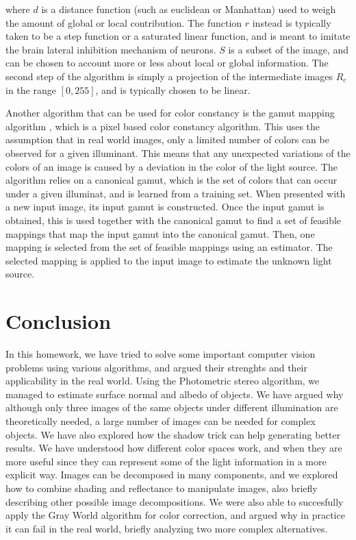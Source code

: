 \documentclass{article}
\begin{document}
\begin{enumerate}
    where $d$ is a distance function (such as euclidean or Manhattan) used to weigh the amount of global or local contribution. The function $r$ instead is typically taken to be a step function or a saturated linear function, and is meant to imitate the brain lateral inhibition mechanism of neurons. $S$ is a subset of the image, and can be chosen to account more or less about local or global information.
    The second step of the algorithm is simply a projection of the intermediate images $R_c$ in the range $[0, 255]$, and is typically chosen to be linear.
    
    Another algorithm that can be used for color constancy is the gamut mapping algorithm \cite{gamut}, which is a pixel based color constancy algorithm. This uses the assumption that in real world images, only a limited number of colors can be observed for a given illuminant. This means that any unexpected variations of the colors of an image is caused by a deviation in the color of the light source. The algorithm relies on a canonical gamut, which is the set of colors that can occur under a given illuminat, and is learned from a training set.
    When presented with a new input image, its input gamut is constructed. Once the input gamut is obtained, this is used together with the canonical gamut to find a set of feasible mappings that map the input gamut into the canonical gamut. Then, one mapping is selected from the set of feasible mappings using an estimator. The selected mapping is applied to the input image to estimate the unknown light source.
\end{enumerate}

\section{Conclusion}

In this homework, we have tried to solve some important computer vision problems using various algorithms, and argued their strenghts and their applicability in the real world. Using the Photometric stereo algorithm, we managed to estimate surface normal and albedo of objects. We have argued why although only three images of the same objects under different illumination are theoretically needed, a large number of images can be needed for complex objects. We have also explored how the shadow trick can help generating better results.
We have understood how different color spaces work, and when they are more useful since they can represent some of the light information in a more explicit way.
Images can be decomposed in many components, and we explored how to combine shading and reflectance to manipulate images, also briefly describing other possible image decompositions. 
We were also able to succesfully apply the Gray World algorithm  for color correction, and argued why in practice it can fail in the real world, briefly analyzing two more complex alternatives.




\end{document}
